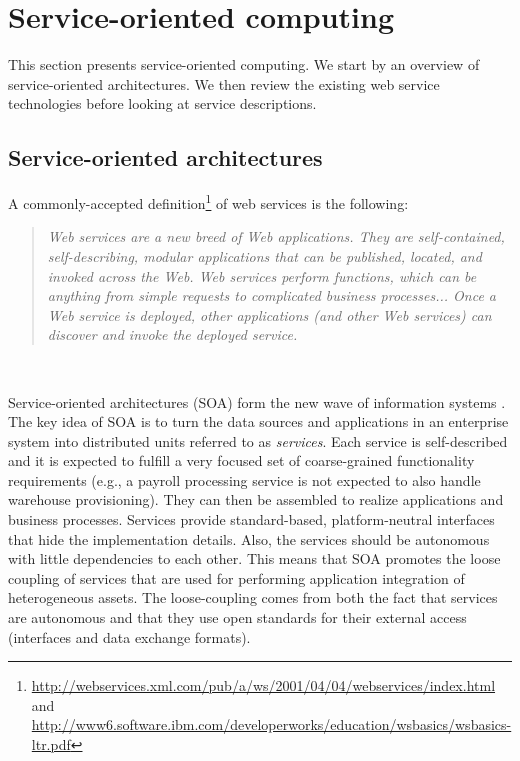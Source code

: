 
\section{Service-oriented computing}


This section presents service-oriented computing. We start by an overview of service-oriented architectures. We then review the existing web service technologies before looking at service descriptions.


\subsection{Service-oriented architectures}


A commonly-accepted definition\footnote{\url{http://webservices.xml.com/pub/a/ws/2001/04/04/webservices/index.html} and \url{http://www6.software.ibm.com/developerworks/education/wsbasics/wsbasics-ltr.pdf}} of web services is the following:
\begin{quote}
\textsl{
Web services are a new breed of Web applications. They are self-contained, self-describing, modular applications that can be published, located, and invoked across the Web. Web services perform functions, which can be anything from simple requests to complicated business processes... Once a Web service is deployed, other applications (and other Web services) can discover and invoke the deployed service.
}
\end{quote}\

Service-oriented architectures (SOA) form the new wave of information systems \cite{PTDL07,PH07}. The key idea of SOA is to turn the data sources and applications in an enterprise system into  distributed units referred to as \emph{services}. Each service is self-described and it is expected to fulfill a very focused set of coarse-grained functionality requirements (e.g., a payroll processing service is not expected to also handle warehouse provisioning). They can then be assembled to realize applications and business processes. Services provide standard-based, platform-neutral interfaces that hide the implementation details. Also, the services should be autonomous with little dependencies to each other. This means that SOA promotes the loose coupling of services that are used for performing application integration of heterogeneous assets. The loose-coupling comes from both the fact that services are autonomous and that they use open standards for their external access (interfaces and data exchange formats).\\

